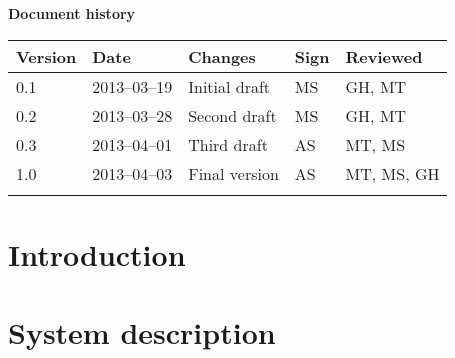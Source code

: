\documentclass[10pt, a4paper, twoside]{article}
\numberwithin{equation}{subsection}
\numberwithin{figure}{section}
\numberwithin{table}{section}
\begin{document}



\newpage
\pagestyle{fancy}
\setcounter{page}{2} %




\newpage
\tableofcontents
\listoffigures



\newpage
\vspace*{5\baselineskip}

\begin{center}
\textbf{\LARGE Document history}

{ \footnotesize 
\begin{tabular}{|p{1cm}|p{2.0cm}|p{5cm}|p{1.5cm}|p{2cm}|}
	\hline
	\textbf{Version} & \textbf{Date} & \textbf{Changes} & \textbf{Sign} & \textbf{Reviewed} \\
	
	\hline
	0.1 & 2013--03--19 & Initial draft & MS & GH, MT\\
	
	\hline
	0.2 & 2013--03--28 & Second draft & MS & GH, MT\\
	
	\hline
	0.3 & 2013--04--01 & Third draft & AS & MT, MS\\
	
	\hline
	1.0 & 2013--04--03 & Final version & AS & MT, MS, GH\\
	
	\hline
	 &  &  &  &  \\
	
	\hline
\end{tabular}
}
\end{center}





%
%
\newpage
{}

\newpage
\section{Introduction}


\section{System description}

\end{document}
